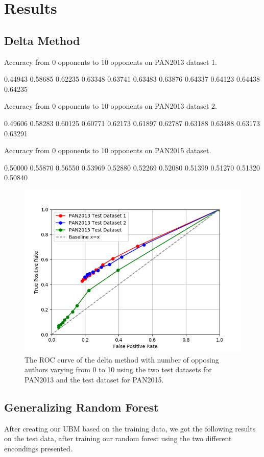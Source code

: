 \section{Results}

\subsection{Delta Method}
Accuracy from 0 opponents to 10 opponents on PAN2013 dataset 1.

0.44943
0.58685
0.62235
0.63348
0.63741
0.63483
0.63876
0.64337
0.64123
0.64438
0.64235

Accuracy from 0 opponents to 10 opponents on PAN2013 dataset 2.

0.49606
0.58283
0.60125
0.60771
0.62173
0.61897
0.62787
0.63188
0.63488
0.63173
0.63291

Accuracy from 0 opponents to 10 opponents on PAN2015 dataset.

0.50000
0.55870
0.56550
0.53969
0.52880
0.52269
0.52080
0.51399
0.51270
0.51320
0.50840

\begin{figure}
    \centering
    \includegraphics[width=.7\textwidth]{./pictures/delta_method_roc.png}
    \caption{The ROC curve of the delta method with number of opposing authors
    varying from 0 to 10 using the two test datasets for PAN2013 and the test
    dataset for PAN2015.}
    \label{fig:delta_method_roc}
\end{figure}

\subsection{Generalizing Random Forest}
After creating our \gls{UBM} based on the training data, we got the following results on the test 
data, after training our random forest using the two different encondings presented.

